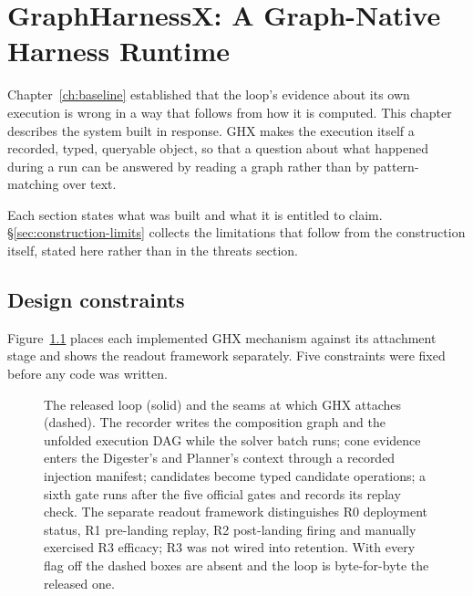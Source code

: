 \chapter{GraphHarnessX: A Graph-Native Harness Runtime}
\label{ch:ghx}


Chapter~\ref{ch:baseline} established that the loop's evidence about its
own execution is wrong in a way that follows from how it is computed. This
chapter describes the system built in response. GHX makes the execution
itself a recorded, typed, queryable object, so that a question about what
happened during a run can be answered by reading a graph rather than by
pattern-matching over text.

Each section states what was built and what it is entitled to claim.
\S\ref{sec:construction-limits} collects the limitations that follow from
the construction itself, stated here rather than in the threats section.

\section{Design constraints}
\label{sec:constraints}

Figure~\ref{fig:loop} places each implemented GHX mechanism against its
attachment stage and shows the readout framework separately. Five constraints
were fixed before any code was written.

\begin{figure}[t]
\centering
\resizebox{\textwidth}{!}{}
\caption[The released loop and where GHX attaches]{The released
loop (solid) and the seams at which GHX attaches (dashed).
The recorder writes the composition graph and the unfolded execution
DAG while the solver batch runs; cone evidence enters the Digester's and
Planner's context through a recorded injection manifest; candidates
become typed candidate operations; a sixth gate runs after the five official
gates and records its replay check. The separate readout framework distinguishes R0
deployment status, R1 pre-landing replay, R2 post-landing firing and manually
exercised R3 efficacy; R3 was not wired into retention. With every flag off the dashed boxes are absent and
the loop is byte-for-byte the released one.}
\label{fig:loop}
\end{figure}

